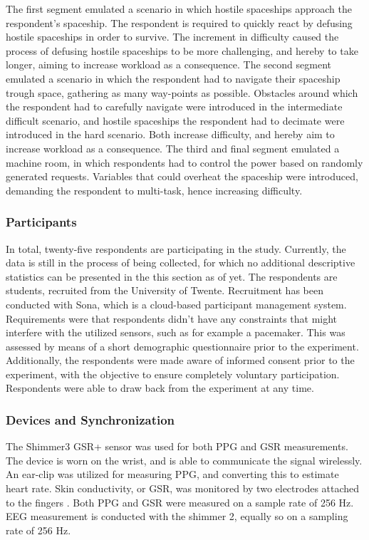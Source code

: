 \documentclass[12pt]{article}
\begin{document}
The first segment emulated a scenario in which hostile spaceships approach the respondent's spaceship. The respondent is required to  quickly react by defusing hostile spaceships in order to survive. The increment in difficulty caused the process of defusing hostile spaceships to be more challenging, and hereby to take longer,  aiming to increase workload as a consequence. The second segment emulated a scenario in which the respondent had to navigate their spaceship trough space, gathering as many way-points as possible. Obstacles around which the respondent had to carefully navigate were introduced in the intermediate difficult scenario, and hostile spaceships the respondent had to decimate were introduced in the hard scenario. Both increase difficulty, and hereby aim to increase workload as a consequence. The third and final segment emulated a machine room, in which respondents had to control the power based on randomly generated requests. Variables that could overheat the spaceship were introduced, demanding the respondent to multi-task, hence increasing difficulty. 

\subsubsection{Participants}
In total, twenty-five respondents are participating in the study. Currently, the data is still in the process of being collected, for which no additional descriptive statistics can be presented in the this section as of yet. The respondents are students, recruited from the University of Twente. Recruitment has been conducted with Sona, which is a cloud-based participant management system. Requirements were that respondents didn't have any constraints that might interfere with the utilized sensors, such as for example a pacemaker. This was assessed by means of a short demographic questionnaire prior to the experiment. Additionally, the respondents were made aware of informed consent prior to the experiment, with the objective to ensure completely voluntary participation. Respondents were able to draw back from the experiment at any time. 

\subsubsection{Devices and Synchronization}
The Shimmer3 GSR+ sensor was used for both PPG and GSR measurements. The device is worn on the wrist, and is able to communicate the signal wirelessly. An ear-clip was utilized for measuring PPG, and converting this to estimate heart rate. Skin conductivity, or GSR, was monitored by two electrodes attached to the fingers \cite{shimmer}. Both PPG and GSR were measured on a sample rate of 256 Hz. EEG measurement is conducted with the shimmer 2, equally so on a sampling rate of 256 Hz.
\end{document}
